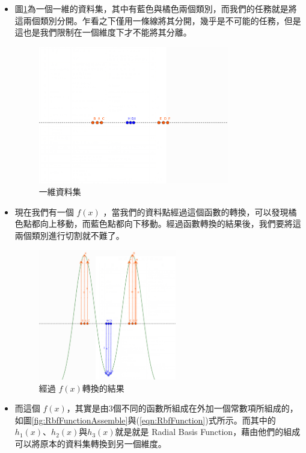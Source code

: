 \begin{itemize}
	\item

	      圖\ref{fig:RbfIntroductionNotTransfer}為一個一維的資料集，其中有藍色與橘色兩個類別，而我們的任務就是將這兩個類別分開。乍看之下僅用一條線將其分開，幾乎是不可能的任務，但是這也是我們限制在一個維度下才不能將其分離。



	      \begin{figure}[h]
		      \centering
		      \includegraphics[height=6cm]{./pic/vM4xT9rm.png}
		      \caption{一維資料集}
		      \label{fig:RbfIntroductionNotTransfer}
	      \end{figure}

	\item
	      現在我們有一個 \(f(x)\) ，當我們的資料點經過這個函數的轉換，可以發現橘色點都向上移動，而藍色點都向下移動。經過函數轉換的結果後，我們要將這兩個類別進行切割就不難了。

	      \begin{figure}[h]
		      \centering
		      \includegraphics[width=6cm]{./pic/7VM3Lid5.png}
		      \caption{經過 \(f(x)\)轉換的結果 }
		      \label{fig:RbfWithFunction}
	      \end{figure}


	\item
	      而這個 \(f(x)\)，其實是由3個不同的函數所組成在外加一個常數項所組成的，如圖\ref{fig:RbfFunctionAssemble}與(\ref{eqn:RbfFunction})式所示。而其中的 \(h_1(x)\)、\(h_2(x)\)與\(h_3(x)\)就是就是 Radial Basis Function，藉由他們的組成可以將原本的資料集轉換到另一個維度。


\end{itemize}
